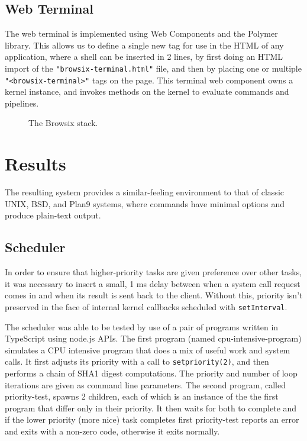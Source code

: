 \documentclass{acm_proc_article-sp}
\begin{document}
\subsection{Web Terminal}

The web terminal is implemented using Web Components and the Polymer
library.  This allows us to define a single new tag for use in the
HTML of any application, where a shell can be inserted in 2 lines, by
first doing an HTML import of the \texttt{"browsix-terminal.html"}
file, and then by placing one or multiple
\texttt{"<browsix-terminal>"} tags on the page.  This terminal web
component owns a kernel instance, and invokes methods on the kernel to
evaluate commands and pipelines.

\begin{figure}
\centering
{}
\caption{The Browsix stack.}
\end{figure}

\section{Results}

The resulting system provides a similar-feeling environment to that of
classic UNIX, BSD, and Plan9 systems, where commands have minimal
options and produce plain-text output.

\subsection{Scheduler}

In order to ensure that higher-priority tasks are given preference
over other tasks, it was necessary to insert a small, 1 ms delay
between when a system call request comes in and when its result is
sent back to the client.  Without this, priority isn't preserved in
the face of internal kernel callbacks scheduled with
\texttt{setInterval}.

The scheduler was able to be tested by use of a pair of programs
written in TypeScript using node.js APIs.  The first program (named
cpu-intensive-program) simulates a CPU intensive program that does a
mix of useful work and system calls.  It first adjusts its priority
with a call to \texttt{setpriority(2)}, and then performs a chain of
SHA1 digest computations.  The priority and number of loop iterations
are given as command line parameters.  The second program, called
priority-test, spawns 2 children, each of which is an instance of the
the first program that differ only in their priority.  It then waits
for both to complete and if the lower priority (more nice) task
completes first priority-test reports an error and exits with a
non-zero code, otherwise it exits normally.
\end{document}

